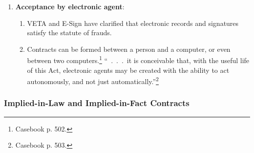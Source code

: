 \begin{enumerate}
\begin{enumerate}
        say that a seller of goods like these could wait indefinitely to 
        decide whether or not he will accept the offer of the proposed 
        buyer.''\footnote{Casebook p. 497.} \emph{Cole-McIntyre-Norfleet Co. 
        v. Holloway}. In some cases, there is a duty to promptly reply, and 
        unreasonable delay will count as acceptance---e.g., a hail insurer 
        waiting two months to send a rejection. \emph{Kukusa v. Home Mut. 
        Hail-Tornado Ins. Co.}
        \item Repeated orders for the same product can count as a 
        \textbf{standing offer}. If the buyer does not reject future 
        shipments, his silence counts as acceptance. \emph{Hobbs v. Massasoit 
        Whip Co.}
        \item Taking physical control of shipped goods counts as acceptance of 
        the shipment. \emph{Louisville Tin \& Stove Co. v. Lay}.
        \item If you enjoy the benefit of an unwanted thing, you have to pay 
        for it---e.g., an expired newspaper subscription. \emph{Austin v. 
        Burge}.
        \item A \textbf{negative-option} plan involves a subscription for 
        merchandise, like a book or record club. They differ from unordered 
        goods in that the customer contracts in advance. Silence indicates 
        continued acceptance.
    \end{enumerate}
    \item \textbf{Acceptance by electronic agent}:
    \begin{enumerate}
        \item VETA and E-Sign have clarified that electronic records and 
        signatures satisfy the statute of frauds.
        \item Contracts can be formed between a person and a computer, or even 
        between two computers.\footnote{Casebook p. 502.} ``~.~.~.~it is 
        conceivable that, with the useful life of this Act, electronic agents 
        may be created with the ability to act autonomously, and not just 
        automatically.''\footnote{Casebook p. 503.}
    \end{enumerate}
\end{enumerate}

\subsubsection{Implied-in-Law and Implied-in-Fact Contracts}

